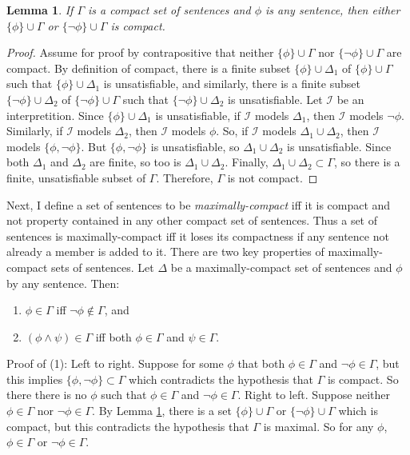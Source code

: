\documentclass[12pt]{article}
\newtheorem{lemma}[theorem]{Lemma}
\theoremstyle{definition}
\theoremstyle{remark}
\begin{document}
\begin{lemma}
	\label{lem:either-or-compact}
	If $\Gamma$ is a compact set of sentences and $\phi$ is any sentence, then either $\{ \phi \} \cup \Gamma$ or $\{ \neg\phi \} \cup \Gamma$ is compact.
\end{lemma}

\begin{proof}
	Assume for proof by contrapositive that neither $\{ \phi \} \cup \Gamma$ nor $\{ \neg\phi \} \cup \Gamma$ are compact. By definition of compact, there is a finite subset $\{ \phi \} \cup \Delta_1$ of $\{ \phi \} \cup \Gamma $ such that $\{ \phi \} \cup \Delta_1$ is unsatisfiable, and similarly, there is a finite subset $\{ \neg\phi \} \cup \Delta_2$ of $\{ \neg\phi \} \cup \Gamma$ such that $\{ \neg\phi \} \cup \Delta_2$ is unsatisfiable. Let $\mathscr{I}$ be an interpretition. Since $\{ \phi \} \cup \Delta_1$ is unsatisfiable, if $\mathscr{I}$ models $\Delta_1$, then $\mathscr{I}$ models $\neg\phi$. Similarly, if $\mathscr{I}$ models $\Delta_2$, then $\mathscr{I}$ models $\phi$. So, if $\mathscr{I}$ models $\Delta_1 \cup \Delta_2$, then $\mathscr{I}$ models $\{ \phi, \neg\phi \}$. But $\{ \phi, \neg\phi \}$ is unsatisfiable, so $\Delta_1 \cup \Delta_2$ is unsatisfiable. Since both $\Delta_1$ and $\Delta_2$ are finite, so too is $\Delta_1 \cup \Delta_2$. Finally, $\Delta_1 \cup \Delta_2 \subset \Gamma$, so there is a finite, unsatisfiable subset of $\Gamma$. Therefore, $\Gamma$ is not compact.
\end{proof}

Next, I define a set of sentences to be \textit{maximally-compact} iff it is compact and not property contained in any other compact set of sentences. Thus a set of sentences is maximally-compact iff it loses its compactness if any sentence not already a member is added to it. There are two key properties of maximally-compact sets of sentences. Let $\Delta$ be a maximally-compact set of sentences and $\phi$ by any sentence. Then:

\begin{enumerate}
	\item[(1)] $\phi \in \Gamma$ iff $\neg\phi \not\in \Gamma$, and
	\item[(2)] $(\phi \land \psi) \in \Gamma$ iff both $\phi \in \Gamma$ and $\psi \in \Gamma$.
\end{enumerate}

Proof of (1): Left to right. Suppose for some $\phi$ that both $\phi \in \Gamma$ and $\neg\phi \in \Gamma$, but this implies $\{ \phi, \neg\phi \} \subset \Gamma$ which contradicts the hypothesis that $\Gamma$ is compact. So there there is no $\phi$ such that $\phi \in \Gamma$ and $\neg\phi \in \Gamma$. Right to left. Suppose neither $\phi \in \Gamma$ nor $\neg\phi \in \Gamma$. By Lemma \ref{lem:either-or-compact}, there is a set $\{ \phi \} \cup \Gamma$ or $\{ \neg\phi \} \cup \Gamma$ which is compact, but this contradicts the hypothesis that $\Gamma$ is maximal. So for any $\phi$, $\phi \in \Gamma$ or $\neg\phi \in \Gamma$.
\end{document}
